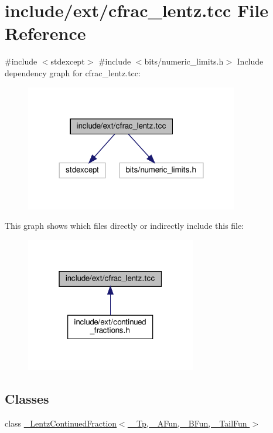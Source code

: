 \hypertarget{cfrac__lentz_8tcc}{}\section{include/ext/cfrac\+\_\+lentz.tcc File Reference}
\label{cfrac__lentz_8tcc}
{\ttfamily \#include $<$stdexcept$>$}\newline
{\ttfamily \#include $<$bits/numeric\+\_\+limits.\+h$>$}\newline
Include dependency graph for cfrac\+\_\+lentz.\+tcc\+:
\nopagebreak
\begin{figure}[H]
\begin{center}
\leavevmode
\includegraphics[width=264pt]{cfrac__lentz_8tcc__incl}
\end{center}
\end{figure}
This graph shows which files directly or indirectly include this file\+:
\nopagebreak
\begin{figure}[H]
\begin{center}
\leavevmode
\includegraphics[width=211pt]{cfrac__lentz_8tcc__dep__incl}
\end{center}
\end{figure}
\subsection*{Classes}
\begin{DoxyCompactItemize}
\item 
class \hyperlink{class__LentzContinuedFraction}{\+\_\+\+Lentz\+Continued\+Fraction$<$ \+\_\+\+Tp, \+\_\+\+A\+Fun, \+\_\+\+B\+Fun, \+\_\+\+Tail\+Fun $>$}
\end{DoxyCompactItemize}
